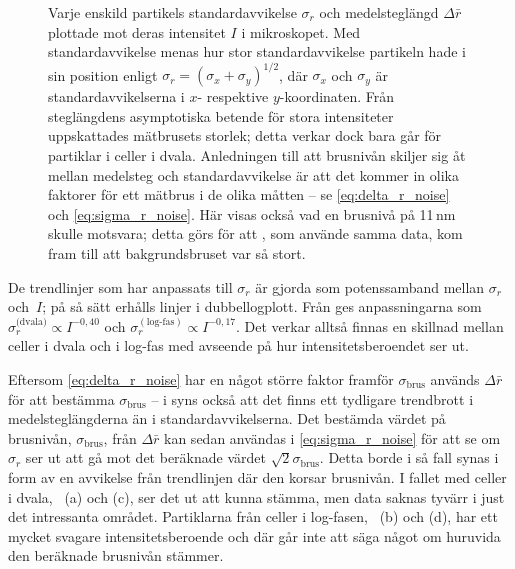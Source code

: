 \begin{figure}\centering
   \subfigure[][]{}
   \subfigure[][]{}
   \subfigure[][]{}
   \subfigure[][]{}
\caption{Varje enskild partikels standardavvikelse $\sigma_r$ och medelsteglängd $\Delta{\bar{r}}$ plottade mot deras intensitet $I$ i mikroskopet. 
Med standardavvikelse menas hur stor standardavvikelse partikeln hade i sin position enligt $\sigma_r=(\sigma_x+\sigma_y)^{1/2}$, där $\sigma_x$ och $\sigma_y$ är standardavvikelserna i $x$- respektive $y$-koordinaten.
Från steglängdens asymptotiska betende för stora intensiteter uppskattades mätbrusets storlek; detta verkar dock bara går för partiklar i celler i dvala. 
Anledningen till att brusnivån skiljer sig åt mellan medelsteg och standardavvikelse är att det kommer in olika faktorer för ett mätbrus i de olika måtten -- se \eqref{eq:delta_r_noise} och \eqref{eq:sigma_r_noise}. 
Här visas också vad en brusnivå på 11\,nm skulle motsvara; detta görs för att \cite{Midtveldt_etal2016}, som använde samma data, kom fram till att bakgrundsbruset var så stort.}
\label{fig:storleksberoende}
\end{figure}

De trendlinjer som har anpassats till $\sigma_r$ är gjorda som potenssamband mellan $\sigma_r$ och~$I$; på så sätt erhålls linjer i dubbellogplott. Från  ges anpassningarna som $\sigma_r^{\text{(dvala)}} \propto I^{-0,40}$ och $\sigma_r^{(\text{log-fas})} \propto I^{-0,17}$. Det verkar alltså finnas en skillnad mellan celler i dvala och i log-fas med avseende på hur intensitetsberoendet ser ut.

Eftersom \eqref{eq:delta_r_noise} har en något större faktor framför $\sigma_\text{brus}$ används $\Delta{\bar{r}}$ för att bestämma $\sigma_\text{brus}$ -- i  syns också att det finns ett tydligare trendbrott i medelsteglängderna än i standardavvikelserna. Det bestämda värdet på brusnivån, $\sigma_\text{brus}$, från $\Delta{\bar{r}}$ kan sedan användas i \eqref{eq:sigma_r_noise} för att se om $\sigma_r$ ser ut att gå mot det beräknade värdet $\sqrt{2}\sigma_\text{brus}$. Detta borde i så fall synas i form av en avvikelse från trendlinjen där den korsar brusnivån.
I fallet med celler i dvala, ~(a) och (c), ser det ut att kunna stämma, men data saknas tyvärr i just det intressanta området. Partiklarna från celler i log-fasen, ~(b) och (d), har ett mycket svagare intensitetsberoende och där går inte att säga något om huruvida den beräknade brusnivån stämmer. 

